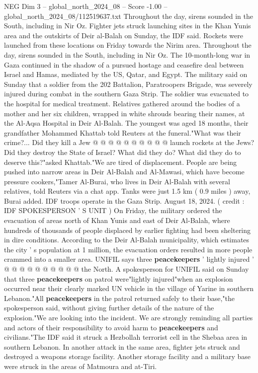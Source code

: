 \begin{textsample}{NEG Dim 3 – global\_north\_2024\_08 – Score -1.00 – global\_north\_2024\_08/112519637.txt}  \label{ex:f3_neg_311}
Throughout the day, sirens sounded in the South, including in Nir Oz.
Fighter jets struck launching sites in the Khan Yunis area and the outskirts of Deir al-Balah on Sunday, the IDF said.
Rockets were launched from these locations on Friday towards the Nirim area.
Throughout the day, sirens sounded in the South, including in Nir Oz.
The 10-month-long war in Gaza continued in the shadow of a pursued hostage and ceasefire deal between Israel and Hamas, mediated by the US, Qatar, and Egypt.
The military said on Sunday that a soldier from the 202 Battalion, Paratroopers Brigade, was severely injured during combat in the southern Gaza Strip.
The soldier was evacuated to the hospital for medical treatment.
Relatives gathered around the bodies of a mother and her six children, wrapped in white shrouds bearing their names, at the Al-Aqsa Hospital in Deir Al-Balah.
The youngest was aged 18 months, their grandfather Mohammed Khattab told Reuters at the funeral."What was their crime?...
Did they kill a Jew @ @ @ @ @ @ @ @ @ @ launch rockets at the Jews?
Did they destroy the State of Israel?
What did they do?
What did they do to deserve this?"asked Khattab."We are tired of displacement.
People are being pushed into narrow areas in Deir Al-Balah and Al-Mawasi, which have become pressure cookers,"Tamer Al-Burai, who lives in Deir Al-Balah with several relatives, told Reuters via a chat app.
Tanks were just 1.5 km ( 0.9 miles ) away, Burai added.
IDF troops operate in the Gaza Strip.
August 18, 2024. ( credit : IDF SPOKESPERSON ' S UNIT ) On Friday, the military ordered the evacuation of areas north of Khan Yunis and east of Deir Al-Balah, where hundreds of thousands of people displaced by earlier fighting had been sheltering in dire conditions.
According to the Deir Al-Balah municipality, which estimates the city ' s population at 1 million, the evacuation orders resulted in more people crammed into a smaller area.
UNIFIL says three \textbf{peacekeepers} ' lightly injured ' @ @ @ @ @ @ @ @ @ @ the North.
A spokesperson for UNIFIL said on Sunday that three \textbf{peacekeepers} on patrol were"lightly injured"when an explosion occurred near their clearly marked UN vehicle in the village of Yarine in southern Lebanon."All \textbf{peacekeepers} in the patrol returned safely to their base,"the spokesperson said, without giving further details of the nature of the explosion."We are looking into the incident.
We are strongly reminding all parties and actors of their responsibility to avoid harm to \textbf{peacekeepers} and civilians."The IDF said it struck a Hezbollah terrorist cell in the Shebaa area in southern Lebanon.
In another attack in the same area, fighter jets struck and destroyed a weapons storage facility.
Another storage facility and a military base were struck in the areas of Matmoura and at-Tiri.

\end{textsample}
